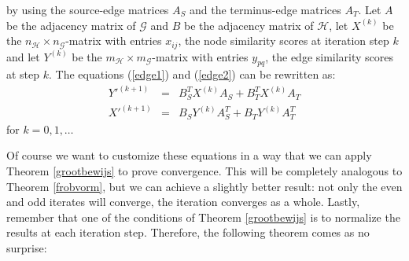 \documentclass[a4paper,11pt]{report}
\newcommand{\graf}{\mathscr{G}}
\newcommand{\grafeen}{\mathscr{H}}
\begin{document}
by using the source-edge matrices $A_S$ and the terminus-edge matrices $A_T$. Let $A$ be the adjacency matrix of $\graf$ and $B$ be the adjacency
matrix of $\grafeen$, let $X^{(k)}$ be the $n_\grafeen \times n_\graf$-matrix with entries $x_{ij}$, the node similarity scores at iteration step $k$ 
and let $Y^{(k)}$ be the $m_\grafeen \times m_\graf$-matrix with entries $y_{pq}$, the edge similarity scores at step $k$. The equations (\ref{edge1}) and (\ref{edge2}) 
can be rewritten as:
\begin{eqnarray}
  Y'^{(k+1)} &=& B_S^TX^{(k)}A_S + B_T^TX^{(k)}A_T\label{edgematrix1}\\
   X'^{(k+1)} &=& B_SY^{(k)}A_S^T + B_TY^{(k)}A^T_T\label{edgematrix2}
 \end{eqnarray}
 for  $k =  0,1,\ldots$
 
 Of course we want to customize these equations in a way that we can apply Theorem \ref{grootbewijs} to prove convergence. 
 This will be completely analogous to Theorem \ref{frobvorm}, but we can achieve a slightly better result: not only the even and odd iterates
 will converge, the iteration converges as a whole. Lastly, remember that one of the conditions of Theorem \ref{grootbewijs} is to 
 normalize the results at each iteration step. Therefore, the following theorem comes as no surprise:
\end{document}
